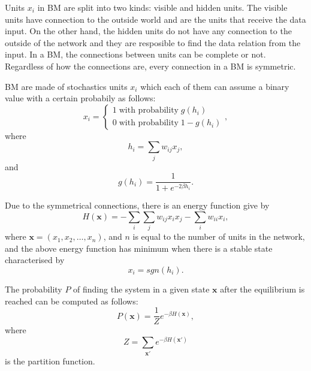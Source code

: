Units $x_{i}$ in BM are split into two kinds: visible and hidden units. 
The visible units have connection to the outside world and are the units that receive the data input. 
On the other hand, the hidden units do not have any connection to the outside of the network and they are resposible to find the data relation from the input. 
In a BM, the connections between units can be complete or not. 
Regardless of how the connections are, every connection in a BM is symmetric.

BM are made of stochastics units $x_{i}$ which each of them can assume a binary value with a certain probabily as follows:
\begin{equation}
  x_{i} =
    \begin{cases}
      1 \; \text{with probability} \; g(h_{i}) \\
      0 \; \text{with probability} \; 1 - g(h_{i})
    \end{cases},
  \label{eq:eq1}
\end{equation}
where
\begin{equation}
  h_{i} = \sum_{j}w_{ij}x_{j},
  \label{eq:eq2}
\end{equation}
and
\begin{equation}
  g(h_{i}) = \frac{1}{1 + e^{-2 \beta h_{i}}}.
  \label{eq:eq3}
\end{equation}

Due to the symmetrical connections, there is an energy function give by
\begin{equation}
  H(\mathbf{x}) = - \sum_{i} \sum_{j} w_{ij}x_{i}x_{j} - \sum_{i} w_{ii}x_{i},
  \label{eq:eq4}
\end{equation}
where $\mathbf{x} = (x_{1}, x_{2}, \dots, x_{n})$, and $n$ is equal to the number of units in the network, and the above energy function has minimum when there is a stable state characterised by
\begin{equation}
  x_{i} = sgn(h_{i}).
  \label{eq:eq5}
\end{equation}

The probability $P$ of finding the system in a given state $\mathbf{x}$ after the equilibrium is reached can be computed as follows:
\begin{equation}
  P(\mathbf{x}) = \frac{1}{Z} e^{-\beta H(\mathbf{x})},
  \label{eq:eq6}
\end{equation}
where
\begin{equation}
  Z = \sum_{\mathbf{x}'} e^{-\beta H(\mathbf{x}')}
  \label{eq:eq7}
\end{equation}
is the partition function.

